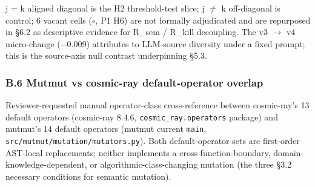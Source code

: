 \documentclass[review,12pt,authoryear]{elsarticle}
\begin{document}
j = k aligned diagonal is the H2 threshold-test slice; j $\neq$ k
off-diagonal is control; 6 vacant cells ($\circ$, P1 H6) are not formally
adjudicated and are repurposed in §6.2 as descriptive evidence for
R\_sem / R\_kill decoupling. The v3 $\to$ v4 micro-change (−0.009)
attributes to LLM-source diversity under a fixed prompt; this is the
source-axis null contrast underpinning §5.3.

\subsubsection{B.6 Mutmut vs cosmic-ray default-operator
overlap}\label{b.6-mutmut-vs-cosmic-ray-default-operator-overlap}

Reviewer-requested manual operator-class cross-reference between
cosmic-ray's 13 default operators (cosmic-ray 8.4.6,
\texttt{cosmic\_ray.operators} package) and mutmut's 14 default
operators (mutmut current \texttt{main},
\texttt{src/mutmut/mutation/mutators.py}). Both default-operator sets
are first-order AST-local replacements; neither implements a
cross-function-boundary, domain-knowledge-dependent, or
algorithmic-class-changing mutation (the three §3.2 necessary conditions
for semantic mutation).
\end{document}
